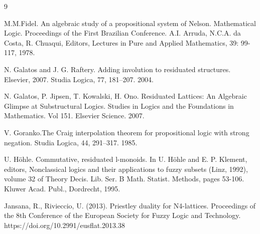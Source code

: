 \documentclass[pdflatex,sn-mathphys-num]{sn-jnl}%
\theoremstyle{thmstyleone}%
\theoremstyle{thmstyletwo}%
\theoremstyle{thmstylethree}%
\begin{document}
\begin{thebibliography}{9}


 M.M.Fidel. An algebraic study of a propositional system of Nelson. Mathematical Logic. Proceedings of the First Brazilian Conference. A.I. Arruda, N.C.A. da Costa, R. Chuaqui, Editors, Lectures in Pure and Applied Mathematics, 39: 99-117, 1978.



 N. Galatos and J. G. Raftery. Adding involution to residuated structures. Elsevier, 2007. Studia
Logica, 77, 181–207. 2004.


 N. Galatos, P. Jipsen, T. Kowalski, H. Ono. Residuated Lattices: An Algebraic Glimpse at Substructural Logics. Studies in Logics and the Foundations in Mathematics. Vol 151.
Elsevier Science. 2007. 

 V. Goranko.The Craig interpolation theorem for propositional logic with strong negation. Studia Logica, 44, 291–317. 1985.



U. H\"ohle. Commutative, residuated l-monoids. In U. H\"ohle and E. P. Klement, editors, Nonclassical logics and their applications to fuzzy subsets (Linz, 1992), volume 32 of Theory Decis. Lib. Ser. B Math. Statist. Methods, pages 53-106. Kluwer Acad. Publ., Dordrecht, 1995.



 Jansana, R., Rivieccio, U. (2013). Priestley duality for N4-lattices. Proceedings of the 8th Conference of the European Society for Fuzzy Logic and Technology. https://doi.org/10.2991/eusflat.2013.38



\end{thebibliography}
\end{document}
